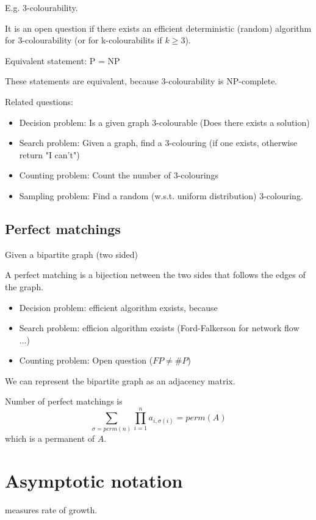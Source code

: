 \documentclass[a4paper,12pt]{article}
\theoremstyle{definition}
\theoremstyle{remark}
\begin{document}
E.g. 3-colourability.

It is an open question if there exists an efficient deterministic (random) algorithm for 3-colourability (or for k-colourabilits if $k \geq 3$).

Equivalent statement: P = NP

These statements are equivalent, because 3-colourability is NP-complete.

Related questions:
\begin{itemize}
    \item Decision problem: Is a given graph 3-colourable (Does there exists a solution)
    \item Search problem: Given a graph, find a 3-colouring (if one exists, otherwise return "I can't")
    \item Counting problem: Count the number of 3-colourings
    \item Sampling problem: Find a random (w.s.t. uniform distribution) 3-colouring.
\end{itemize}

\subsection{Perfect matchings}
Given a bipartite graph (two sided)

A perfect matching is a bijection netween the two sides that follows the edges of the graph.

\begin{itemize}
  \item Decision problem: efficient algorithm exsists, because
  \item Search problem: efficion algorithm exsists (Ford-Falkerson for network flow ...)
  \item Counting problem: Open question ($FP \neq \#P$)
\end{itemize}

We can represent the bipartite graph as an adjacency matrix.

Number of perfect matchings is 
\begin{equation*}
  \sum_{\sigma = perm(n)} \prod_{i = 1}^{n} a_{i, \sigma(i)} = perm(A)
\end{equation*}
which is a permanent of $A$.


\section{Asymptotic notation}
measures rate of growth.
\end{document}
